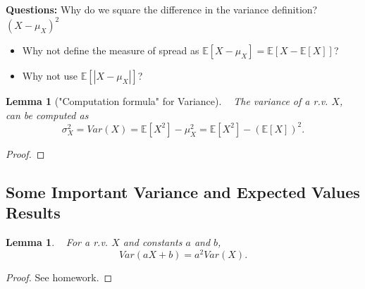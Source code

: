 \documentclass[12pt]{amsart}
\newtheorem{lemma}[theorem]{Lemma}
\begin{document}
{\textbf{Questions:} \newline
Why do we square the difference in the variance definition? $(X-\mu_X)^2$
\begin{itemize}
\item Why not define the measure of spread as $\mathbb{E}[X-\mu_X] = \mathbb{E}[X-\mathbb{E}[X]]$?

\vspace{9cm}
\item  Why not use $\mathbb{E}[|X-\mu_X|]$?

\end{itemize}


\newpage



\begin{lemma}["Computation formula" for Variance]\label{DefVar_Comp}\ \newline
The variance of a r.v. $X$, can be computed as
$$
\sigma_X^2=Var(X)=\mathbb{E}[X^2]-\mu_X^2 = \mathbb{E}[X^2] - (\mathbb{E}[X])^2.
$$ 
\end{lemma}

\begin{proof}
\end{proof}




\newpage

\subsection{Some Important Variance and Expected Values Results}


\begin{lemma}\ \newline
For a r.v. $X$ and constants $a$ and $b$,
$$Var(aX+b) = a^2Var(X).$$
\end{lemma}

\begin{proof} See homework.
\end{proof}

}
\end{document}
